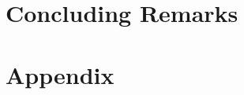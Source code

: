 \documentclass[ twoside,openright,titlepage,numbers=noenddot,%
                headinclude,footinclude,cleardoublepage=empty,abstract=on,
                BCOR=5mm,paper=b5,fontsize=11pt,
		dvipsnames
                ]{scrbook}
\begin{document}
\part{Concluding Remarks}
\cleardoublepage
\appendix
\part{Appendix}

\backmatter
\cleardoublepage
\cleardoublepage
\cleardoublepage
\end{document}
